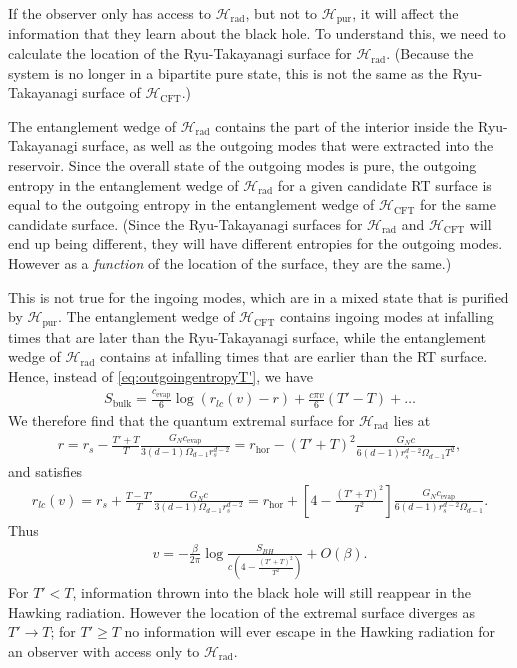 \documentclass[12pt]{article}
\begin{document}
If the observer only has access to $\mathcal{H}_\text{rad}$, but not to $\mathcal{H}_\text{pur}$, it will affect the information that they learn about the black hole. To understand this, we need to calculate the location of the Ryu-Takayanagi surface for $\mathcal{H}_\text{rad}$.  (Because the system is no longer in a bipartite pure state, this is not the same as the Ryu-Takayanagi surface of $\mathcal{H}_\text{CFT}$.)

The entanglement wedge of $\mathcal{H}_\text{rad}$ contains the part of the interior inside the Ryu-Takayanagi surface, as well as the outgoing modes that were extracted into the reservoir. Since the overall state of the outgoing modes is pure, the outgoing entropy in the entanglement wedge of $\mathcal{H}_\text{rad}$ for a given candidate RT surface is equal to the outgoing entropy in the entanglement wedge of $\mathcal{H}_\text{CFT}$ for the same candidate surface. (Since the Ryu-Takayanagi surfaces for $\mathcal{H}_\text{rad}$ and $\mathcal{H}_\text{CFT}$ will end up being different, they will have different entropies for the outgoing modes. However as a \emph{function} of the location of the surface, they are the same.)

This is not true for the ingoing modes, which are in a mixed state that is purified by $\mathcal{H}_\text{pur}$. The entanglement wedge of $\mathcal{H}_\text{CFT}$ contains ingoing modes at infalling times that are later than the Ryu-Takayanagi surface, while the entanglement wedge of $\mathcal{H}_\text{rad}$ contains at infalling times that are earlier than the RT surface. Hence, instead of \eqref{eq:outgoingentropyT'}, we have
\begin{align}
S_\text{bulk} =  \frac{c_\text{evap}}{6}\log\left(r_{lc}(v) - r\right) + \frac{c\pi v}{6}(T' - T) + \dots
\end{align}
We therefore find that the quantum extremal surface for $\mathcal{H}_\text{rad}$ lies at
\begin{align} \label{eq:rqT'}
r = r_s - \frac{T' + T}{T} \frac{G_N c_\text{evap}}{3(d-1) \Omega_{d-1} r_s^{d-2}} = r_\text{hor} - (T'+T)^2 \frac{ G_N c}{6 (d-1) r_s^{d-2} \Omega_{d-1} T^2}, 
\end{align}
and satisfies
\begin{align} \label{eq:rlcT'}
r_{lc}(v) = r_s + \frac{T - T'}{T} \frac{G_N c}{3(d-1) \Omega_{d-1} r_s^{d-2}} = r_\text{hor} +\left[4- \frac{(T'+T)^2}{T^2}\right] \frac{ G_N c_\text{evap}}{6 (d-1) r_s^{d-2} \Omega_{d-1}}.
\end{align}
Thus
\begin{align} \label{eq:vT'}
v = - \frac{\beta}{2 \pi} \log\frac{S_{BH}}{c (4- \frac{(T'+T)^2}{T^2})} + O(\beta).
\end{align}
For $T' < T$, information thrown into the black hole will still reappear in the Hawking radiation. However the location of the extremal surface diverges as $T' \to T$; for $T'\geq T$ no information will ever escape in the Hawking radiation for an observer with access only to $\mathcal{H}_\text{rad}$. 
\end{document}
